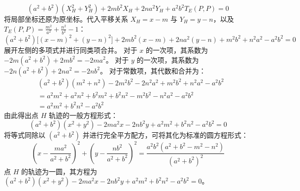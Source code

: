 \begin{solution}
\[ (a^2+b^2)(X_H^2 + Y_H^2) + 2mb^2 X_H + 2na^2 Y_H + a^2b^2 T_E(P,P) = 0 \]
将局部坐标还原为原坐标。代入平移关系 $X_H = x - m$ 与 $Y_H = y - n$，以及 $T_E(P,P) = \frac{m^2}{a^2} + \frac{n^2}{b^2} - 1$：
\[ (a^2+b^2)\big[(x-m)^2 + (y-n)^2\big] + 2mb^2(x-m) + 2na^2(y-n) + m^2 b^2 + n^2 a^2 - a^2 b^2 = 0 \]
展开左侧的多项式并进行同类项合并。
对于 $x$ 的一次项，其系数为 $-2m(a^2+b^2) + 2mb^2 = -2ma^2$。
对于 $y$ 的一次项，其系数为 $-2n(a^2+b^2) + 2na^2 = -2nb^2$。
对于常数项，其代数和合并为：
\begin{align*}
& (a^2+b^2)(m^2+n^2) - 2m^2b^2 - 2n^2a^2 + m^2b^2 + n^2a^2 - a^2b^2 \\
&= a^2m^2 + a^2n^2 + b^2m^2 + b^2n^2 - m^2b^2 - n^2a^2 - a^2b^2 \\
&= a^2m^2 + b^2n^2 - a^2b^2
\end{align*}
由此得出点 $H$ 轨迹的一般方程形式：
\[ (a^2+b^2)(x^2 + y^2) - 2ma^2 x - 2nb^2 y + a^2m^2 + b^2n^2 - a^2b^2 = 0 \]
将等式同除以 $(a^2+b^2)$ 并进行完全平方配方，可将其化为标准的圆方程形式：
\[ \left(x - \frac{ma^2}{a^2+b^2}\right)^2 + \left(y - \frac{nb^2}{a^2+b^2}\right)^2 = \frac{a^2b^2(a^2+b^2-m^2-n^2)}{(a^2+b^2)^2} \]
点 $H$ 的轨迹为一圆，其方程为 $(a^2+b^2)(x^2 + y^2) - 2ma^2 x - 2nb^2 y + a^2m^2 + b^2n^2 - a^2b^2 = 0$。
\end{solution}


